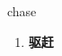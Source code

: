
\begin{frame}
{\huge chase}
\begin{center}
\begin{enumerate}\Large
  \item \textbf{驱赶}
\end{enumerate}
\end{center}
\end{frame}
